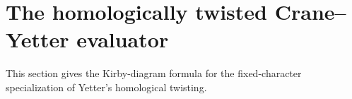 \section{The homologically twisted Crane--Yetter evaluator}
\label{sec:evaluator}

This section gives the Kirby-diagram formula for the fixed-character
specialization of Yetter's homological twisting.



